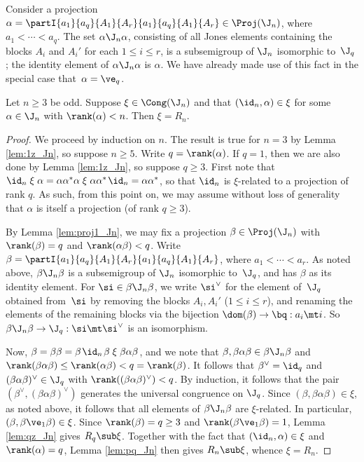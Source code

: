 Consider a projection $\alpha=\partI{a_1}{a_q}{A_1}{A_r}{a_1}{a_q}{A_1}{A_r}\in \Proj(\J_n)$, where $a_1<\cdots<a_q$.  The set $\alpha\J_n\alpha$, consisting of all Jones elements containing the blocks $A_i$ and $A_i'$ for each $1\leq i\leq r$, is a subsemigroup of $\J_n$ isomorphic to~$\J_q$; the identity element of $\alpha\J_n\alpha$ is $\alpha$.  We have already made use of this fact in the special case that~$\alpha=\ve_q$.




\begin{lemma}
\label{lem:1q_Jn}
Let $n\geq3$ be odd.  Suppose $\xi\in\Cong(\J_n)$ and that $(\id_n,\alpha)\in\xi$ for some $\alpha\in\J_n$ with $\rank(\alpha)<n$.  Then $\xi=R_n$.
\end{lemma}

\begin{proof} We proceed by induction on $n$.  The result is true for $n=3$ by Lemma
    \ref{lem:1z_Jn}, so suppose $n\geq5$.  Write $q=\rank(\alpha)$.  If
    $q=1$, then we are also done by Lemma \ref{lem:1z_Jn}, so suppose
    $q\geq3$.  First note that $\id_n \mathrel\xi \alpha = \alpha\alpha^*\alpha \mathrel\xi \alpha\alpha^*\;\!\id_n = \alpha\alpha^*$,
so that $\id_n$ is $\xi$-related to a projection of rank $q$.  As such, from this point on, we may assume without loss of generality that $\alpha$ is itself a projection (of rank $q\geq3$).  

By Lemma \ref{lem:proj1_Jn}, we may fix a projection $\beta\in \Proj(\J_n)$ with $\rank(\beta)=q$ and $\rank(\alpha\beta)<q$.  Write $\beta=\partI{a_1}{a_q}{A_1}{A_r}{a_1}{a_q}{A_1}{A_r}$, where $a_1<\cdots<a_r$.  As noted above, $\beta\J_n\beta$ is a subsemigroup of $\J_n$ isomorphic to~$\J_q$, and has $\beta$ as its identity element.  For $\si\in\beta\J_n\beta$, we write $\si^\vee$ for the element of~$\J_q$ obtained from~$\si$ by removing the blocks $A_i,A_i'$ ($1\leq i\leq r$), and renaming the elements of the remaining blocks via the bijection $\dom(\beta)\to\bq:a_i\mt i$.  So $\beta\J_n\beta\to\J_q:\si\mt\si^\vee$ is an isomorphism.

Now, $\beta=\beta\beta=\beta\;\!\id_n\;\!\beta \mathrel\xi \beta\alpha\beta$, and we note that $\beta,\beta\alpha\beta\in\beta\J_n\beta$ and $\rank(\beta\alpha\beta)\leq\rank(\alpha\beta)<q=\rank(\beta)$.  It follows that $\beta^\vee=\id_q$ and $(\beta\alpha\beta)^\vee\in\J_q$ with ${\rank((\beta\alpha\beta)^\vee)<q}$.  
By induction, it follows that the pair $(\beta^\vee,(\beta\alpha\beta)^\vee)$ generates the universal congruence on $\J_q$.  Since $(\beta,\beta\alpha\beta)\in\xi$, as noted above, it follows that all elements of $\beta\J_n\beta$ are $\xi$-related.  In particular, $(\beta,\beta\ve_1\beta)\in\xi$.  Since $\rank(\beta)=q\geq3$ and $\rank(\beta\ve_1\beta)=1$, Lemma \ref{lem:qz_Jn} gives $R_q\sub\xi$.  Together with the fact that $(\id_n,\alpha)\in\xi$ and $\rank(\alpha)=q$, Lemma \ref{lem:pq_Jn} then gives $R_n\sub\xi$, whence $\xi=R_n$. \end{proof}



